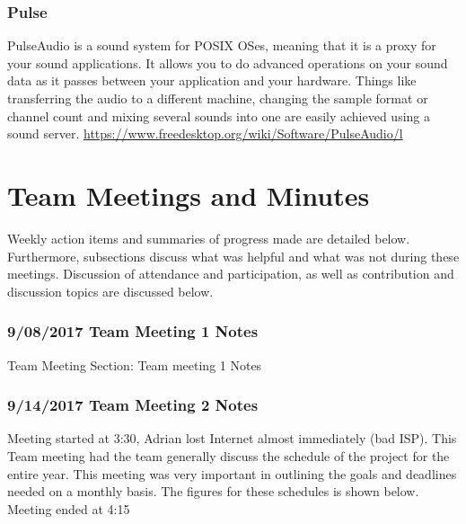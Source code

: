 \documentclass[12pt]{article}
\begin{document}
		\subsubsection{Pulse}
		 PulseAudio is a sound system for POSIX OSes, meaning that it is a proxy for your sound applications. It allows you to do advanced operations on your sound data as it passes between your application and your hardware. Things like transferring the audio to a different machine, changing the sample format or channel count and mixing several sounds into one are easily achieved using a sound server. \url{https://www.freedesktop.org/wiki/Software/PulseAudio/l}
		
	\newpage

\section{Team Meetings and Minutes}
	Weekly action items and summaries of progress made are detailed below. Furthermore, subsections discuss what was helpful and what was not during these meetings. Discussion of attendance and participation, as well as contribution and discussion topics are discussed below.
	
	\subsubsection{9/08/2017 Team Meeting 1 Notes}
		Team Meeting Section: Team meeting 1 Notes 
	
	\subsubsection{9/14/2017 Team Meeting 2 Notes}
	Meeting started at 3:30, Adrian lost Internet almost immediately (bad ISP). This Team meeting had the team generally discuss the schedule of the project for the entire year. This meeting was very important in outlining the goals and deadlines needed on a monthly basis. The figures for these schedules is shown below. Meeting ended at 4:15
	
\end{document}
